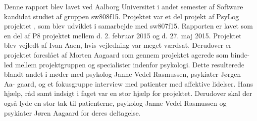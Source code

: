 Denne rapport blev lavet ved Aalborg Universitet i andet semester af Software kandidat studiet af gruppen sw808f15.
Projektet var et del projekt af PsyLog projektet \citep{misc:faellesrapp}, som blev udviklet i samarbejde med sw807f15.
Rapporten er lavet som en del af P8 projektet mellem d. 2. februar 2015 og d. 27. maj 2015.
Projektet blev vejledt af Ivan Aaen, hvis vejledning var meget værdsat.
Derudover er projektet foreslået af Morten Aagaard som gennem projektet agerede som binde-
led mellem projektgruppen og specialister indenfor psykologi. Dette resulterede
blandt andet i møder med psykolog Janne Vedel Rasmussen, psykiater Jørgen Aa-
gaard, og et fokusgruppe interview med patienter med affektive lidelser. Hans
hjælp, råd samt indsigt i faget var en stor hjælp for projektet.
Derudover skal der også lyde en stor tak til patienterne, psykolog Janne Vedel Rasmussen og psykiater Jøren Aagaard for deres deltagelse.
